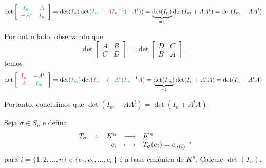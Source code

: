 \documentclass[11pt,a4paper]{article}
\begin{document}
\[\det \left[ \begin{array}{cc} \textcolor{JungleGreen}{I_m} & \textcolor{Magenta}{A} \\ \textcolor{MidnightBlue}{-A^t} & \textcolor{Bittersweet}{I_n} \end{array} \right] = 
\det(\textcolor{Bittersweet}{I_n}) \det(\textcolor{JungleGreen}{I_m} -  \textcolor{Magenta}{A}\textcolor{Bittersweet}{I_n}^{-1}\textcolor{MidnightBlue}{(-A^t)}) = \underbrace{\det(I_n)}_{= 1}\det(I_m + AA^t) = \det(I_m + AA^t)\]

Por outro lado, observando que
\[
\det \begin{bmatrix} A & B \\ C & D \end{bmatrix} = \det \begin{bmatrix} D & C \\ B & A \end{bmatrix}, 
\]
temos
\[\det \left[ \begin{array}{cc} \textcolor{Bittersweet}{I_n}  & \textcolor{MidnightBlue}{-A^t} \\ \textcolor{Magenta}{A}  & \textcolor{JungleGreen}{I_m} \end{array} \right] = \det(\textcolor{JungleGreen}{I_m}) \det(\textcolor{Bittersweet}{I_n} - \textcolor{MidnightBlue}{(-A^t)}\textcolor{JungleGreen}{I_m}^{-1}\textcolor{Magenta}{A}) = \underbrace{\det(I_m)}_{= 1}\det(I_n + A^tA) = \det(I_n + A^tA)\]

Portanto, concluímos que $\det(I_m + AA^t) =\det(I_n + A^tA).$

 Seja $\sigma \in S_n$ e defina 
\[
\fullfunction{T_\sigma}{K^n}{K^n}{e_i}{T_\sigma(e_i) = e_{\sigma(i)}},
\]
para $i = \{ 1, 2, \ldots, n \}$ e $\{e_1, e_2, \ldots, e_n\}$ é a base canônica de $K^n.$ Calcule $\det(T_\sigma).$
\end{document}
